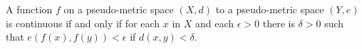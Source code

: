 A function $f$ on a pseudo-metric space $(X,d)$ to a pseudo-metric space $(Y,e)$ is continuous if and only if for each $x$ in $X$ and each $\epsilon > 0$ there is $\delta > 0$ such that $e(f(x), f(y)) < \epsilon$ if $d(x, y) < \delta$.
